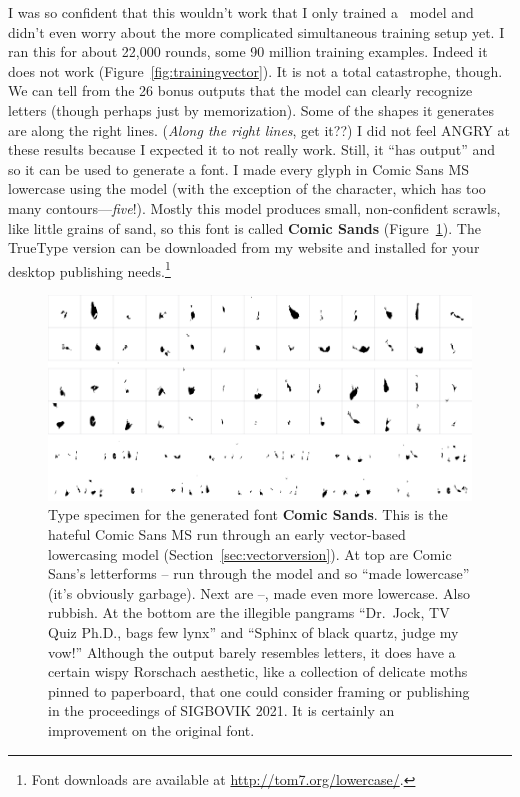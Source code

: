 \documentclass[twocolumn]{article}
\begin{document}
I was so {\tiny confident} that this wouldn't work that I only trained
a \makelowercase\ model and didn't even worry about the more
complicated simultaneous training setup yet. I ran this for about
22,000 rounds, some 90 million training examples. Indeed it does not
work (Figure~\ref{fig:trainingvector}). It is not a total catastrophe,
though. We can tell from the 26 bonus outputs that the model can
clearly recognize letters (though perhaps just by memorization). Some
of the shapes it generates are along the right lines. ({\em Along the
  right lines}, get it??) I did not feel ANGRY at these results
because I expected it to not really work. Still, it ``has output'' and
so it can be used to generate a font. I made every glyph in Comic Sans
MS~\cite{comicsans} lowercase using the model (with the exception of the
 character, which has too many contours---{\it five}!).
Mostly this model produces small, non-confident scrawls, like little
grains of sand, so this font is called {\bf Comic Sands}
(Figure~\ref{fig:comicsands}). The TrueType version can be downloaded
from my website and installed for your desktop publishing
needs.\footnote{Font downloads are available at
  \url{http://tom7.org/lowercase/}.}

\begin{figure}[tp]
\centering
  \includegraphics[width=0.95 \linewidth]{comicsands}
\caption{
  Type specimen for the generated font {\bf Comic Sands}. This is
  the hateful Comic Sans MS run through an early vector-based lowercasing
  model (Section~\ref{sec:vectorversion}). At top are Comic Sans's letterforms
  -- run through the model and so ``made
  lowercase'' (it's obviously garbage). Next are
  --,
  made even more lowercase. Also rubbish.
  At the bottom are the illegible pangrams
  ``Dr.~Jock, TV Quiz Ph.D., bags few lynx''
  and ``Sphinx of black quartz, judge my vow!'' Although the output
  barely resembles letters, it does have a certain wispy
  Rorschach aesthetic, like a collection of delicate moths pinned
  to paperboard, that one could consider framing or publishing in
  the proceedings of SIGBOVIK 2021. It is certainly an improvement on
  the original font.
} \label{fig:comicsands}
\end{figure}
\end{document}
